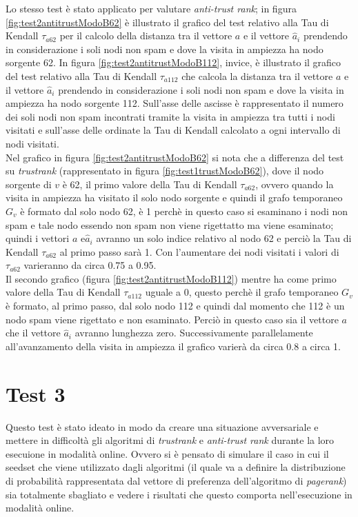 Lo stesso test è stato applicato per valutare \textit{anti-trust rank}; in figura \ref{fig:test2antitrustModoB62} è illustrato il grafico del test relativo alla Tau di Kendall \(\tau_{a62}\) per il calcolo della distanza tra il vettore \(a\) e il vettore \(\hat{a}_i\) prendendo in considerazione i soli nodi non spam e dove  la visita in ampiezza ha nodo sorgente 62. In figura \ref{fig:test2antitrustModoB112}, invice, è illustrato il grafico del test relativo alla Tau di Kendall \(\tau_{a112}\) che  calcola la distanza tra il vettore \(a\) e il vettore \(\hat{a}_i\) prendendo in considerazione i soli nodi non spam e dove la visita in ampiezza ha nodo sorgente 112. Sull'asse delle ascisse è rappresentato il numero dei soli nodi non spam incontrati tramite la visita in ampiezza tra tutti i nodi visitati e sull'asse delle ordinate la Tau di Kendall calcolato a ogni intervallo di nodi visitati.\\
Nel grafico in figura \ref{fig:test2antitrustModoB62} si nota che a differenza del test su \textit{trustrank} (rappresentato in figura \ref{fig:test1trustModoB62}), dove il nodo sorgente di \(v\) è 62, il primo valore della Tau di Kendall \(\tau_{a62}\), ovvero quando la visita in ampiezza ha visitato il solo nodo sorgente e quindi il grafo temporaneo \(G_v\) è formato dal solo nodo 62, è 1 perchè in questo caso si esaminano i nodi non spam e tale nodo essendo non spam non viene rigettatto ma viene esaminato; quindi i vettori \(a\) e\(\hat{a}_i\) avranno un solo indice relativo al nodo 62 e perciò la Tau di Kendall \(\tau_{a62}\) al primo passo sarà 1. Con l'aumentare dei nodi visitati i valori di \(\tau_{a62}\) varieranno da circa 0.75 a 0.95. \\
Il secondo grafico (figura \ref{fig:test2antitrustModoB112}) mentre ha come primo valore della Tau di Kendall \(\tau_{a112}\) uguale a 0, questo perchè il grafo temporaneo \(G_v\) è formato, al primo passo,  dal solo nodo 112 e quindi dal momento che 112 è un nodo spam viene rigettato e non esaminato. Perciò in questo caso sia il vettore \(a\) che il vettore \(\hat{a}_i\) avranno lunghezza zero. Successivamente parallelamente all'avanzamento della visita in ampiezza il grafico varierà da circa 0.8 a circa 1.

\section{Test 3}
Questo test è stato ideato in modo da creare una situazione avversariale e mettere in difficoltà gli algoritmi di \textit{trustrank} e \textit{anti-trust rank} durante la loro esecuione in modalità online. Ovvero si è pensato di simulare il caso in cui il seedset che viene utilizzato dagli algoritmi (il quale va a definire la distribuzione di probabilità rappresentata dal vettore di preferenza dell'algoritmo di \textit{pagerank}) sia totalmente sbagliato e vedere i risultati che questo comporta nell'esecuzione in modalità online.

